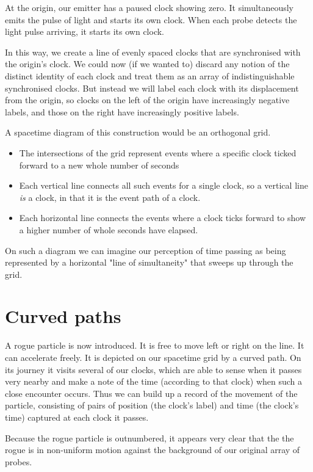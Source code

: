 At the origin, our emitter has a paused clock showing zero. It simultaneously emits the pulse of light and starts its own clock. When each probe detects the light pulse arriving, it starts its own clock.

In this way, we create a line of evenly spaced clocks that are synchronised with the origin's clock. We could now (if we wanted to) discard any notion of the distinct identity of each clock and treat them as an array of indistinguishable synchronised clocks. But instead we will label each clock with its displacement from the origin, so clocks on the left of the origin have increasingly negative labels, and those on the right have increasingly positive labels.

A spacetime diagram of this construction would be an orthogonal grid.

\begin{itemize}
    \item The intersections of the grid represent events where a specific clock ticked forward to a new whole number of seconds
    \item Each vertical line connects all such events for a single clock, so a vertical line \textit{is} a clock, in that it is the event path of a clock.
    \item Each horizontal line connects the events where a clock ticks forward to show a higher number of whole seconds have elapsed.
\end{itemize}

On such a diagram we can imagine our perception of time passing as being represented by a horizontal "line of simultaneity" that sweeps up through the grid.

\section{Curved paths}

A rogue particle is now introduced. It is free to move left or right on the line. It can accelerate freely. It is depicted on our spacetime grid by a curved path. On its journey it visits several of our clocks, which are able to sense when it passes very nearby and make a note of the time (according to that clock) when such a close encounter occurs. Thus we can build up a record of the movement of the particle, consisting of pairs of position (the clock's label) and time (the clock's time) captured at each clock it passes.

Because the rogue particle is outnumbered, it appears very clear that the the rogue is in non-uniform motion against the background of our original array of probes.

